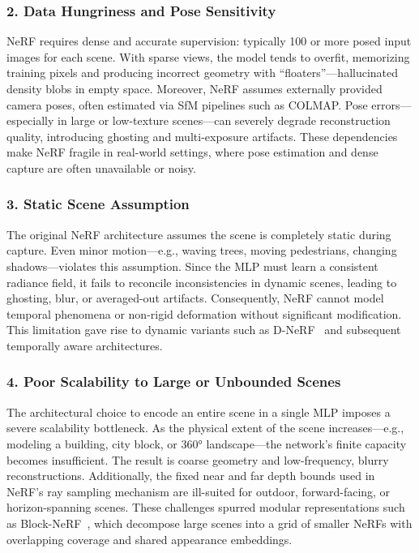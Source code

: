 \subsubsection*{2. Data Hungriness and Pose Sensitivity}

NeRF requires dense and accurate supervision: typically 100 or more posed input images for each scene. With sparse views, the model tends to overfit, memorizing training pixels and producing incorrect geometry with ``floaters''—hallucinated density blobs in empty space. Moreover, NeRF assumes externally provided camera poses, often estimated via SfM pipelines such as COLMAP. Pose errors—especially in large or low-texture scenes—can severely degrade reconstruction quality, introducing ghosting and multi-exposure artifacts. These dependencies make NeRF fragile in real-world settings, where pose estimation and dense capture are often unavailable or noisy.

\newpage

\subsubsection*{3. Static Scene Assumption}

The original NeRF architecture assumes the scene is completely static during capture. Even minor motion—e.g., waving trees, moving pedestrians, changing shadows—violates this assumption. Since the MLP must learn a consistent radiance field, it fails to reconcile inconsistencies in dynamic scenes, leading to ghosting, blur, or averaged-out artifacts. Consequently, NeRF cannot model temporal phenomena or non-rigid deformation without significant modification. This limitation gave rise to dynamic variants such as D-NeRF~\cite{pumarola2021_dnerf} and subsequent temporally aware architectures.

\subsubsection*{4. Poor Scalability to Large or Unbounded Scenes}

The architectural choice to encode an entire scene in a single MLP imposes a severe scalability bottleneck. As the physical extent of the scene increases—e.g., modeling a building, city block, or 360° landscape—the network’s finite capacity becomes insufficient. The result is coarse geometry and low-frequency, blurry reconstructions. Additionally, the fixed near and far depth bounds used in NeRF's ray sampling mechanism are ill-suited for outdoor, forward-facing, or horizon-spanning scenes. These challenges spurred modular representations such as Block-NeRF~\cite{tancik2022_blocknerf}, which decompose large scenes into a grid of smaller NeRFs with overlapping coverage and shared appearance embeddings.

